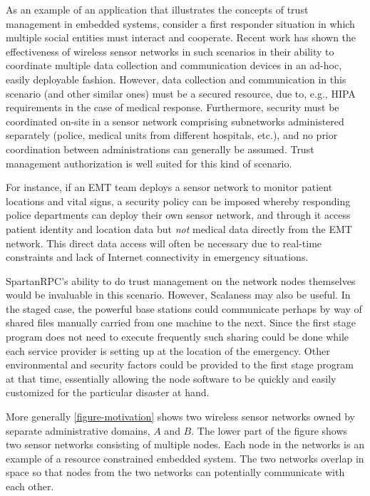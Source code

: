As an example of an application that illustrates the concepts of trust management in embedded
systems, consider a first responder situation in which multiple social entities must interact
and cooperate. Recent work has shown the effectiveness of wireless sensor networks in such
scenarios \cite{citeulike:4460555,1038146} in their ability to coordinate multiple data
collection and communication devices in an ad-hoc, easily deployable fashion. However, data
collection and communication in this scenario (and other similar ones) must be a secured
resource, due to, e.g., HIPA requirements in the case of medical response. Furthermore, security
must be coordinated on-site in a sensor network comprising subnetworks administered separately
(police, medical units from different hospitals, etc.), and no prior coordination between
administrations can generally be assumed. Trust management authorization is well suited for this
kind of scenario.

For instance, if an EMT team deploys a sensor network to monitor patient locations and vital
signs, a security policy can be imposed whereby responding police departments can deploy their
own sensor network, and through it access patient identity and location data but \emph{not}
medical data directly from the EMT network. This direct data access will often be necessary due
to real-time constraints and lack of Internet connectivity in emergency situations.

SpartanRPC's ability to do trust management on the network nodes themselves would be invaluable
in this scenario. However, Scalaness may also be useful. In the staged case, the powerful base
stations could communicate perhaps by way of shared files manually carried from one machine to
the next. Since the first stage program does not need to execute frequently such sharing could
be done while each service provider is setting up at the location of the emergency. Other
environmental and security factors could be provided to the first stage program at that time,
essentially allowing the node software to be quickly and easily customized for the particular
disaster at hand.


More generally \autoref{figure-motivation} shows two wireless sensor networks owned by separate
administrative domains, $A$ and $B$. The lower part of the figure shows two sensor networks
consisting of multiple nodes. Each node in the networks is an example of a resource constrained
embedded system. The two networks overlap in space so that nodes from the two networks can
potentially communicate with each other.

